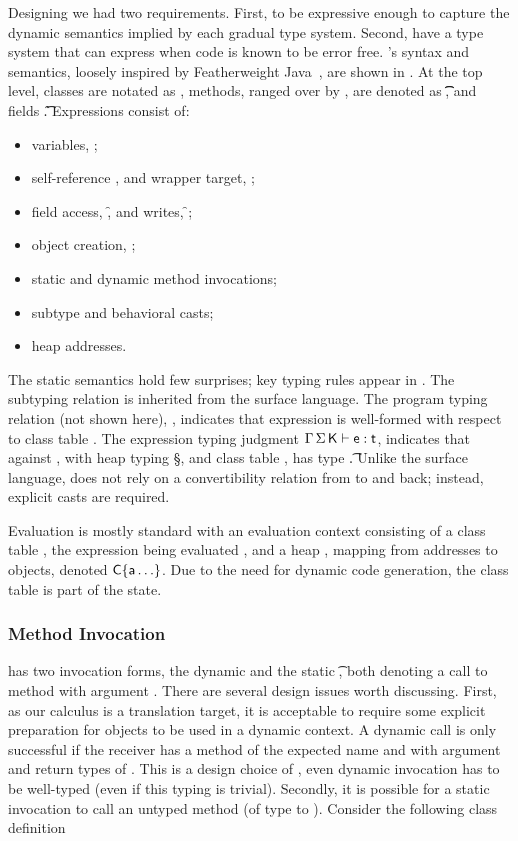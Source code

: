 \documentclass[USenglish]{tex/lipics-v2016}
\begin{document}
Designing \kafka we had two requirements. First, to be expressive enough to
capture the dynamic semantics implied by each gradual type system. Second,
have a type system that can express when code is known to be error
free. \kafka's syntax and semantics, loosely inspired by Featherweight
Java~\cite{FJ}, are shown in .  At the top level, classes
are notated as \Class{}, methods, ranged over by \md,
are denoted as \Mdef\m\x\t\t\e, and fields \Fdef\f\t. Expressions consist
of:

\vspace{-3mm}

\begin{itemize}
\item variables, \x;
\item self-reference \this, and wrapper target, \that;
\item field access, \FRead\f, and writes, \FWrite\f\e;
\item object creation, \New{};
\item static and dynamic method invocations;
\item subtype and behavioral casts;
\item heap addresses.
\end{itemize}

\noindent
The static semantics hold few surprises; key typing rules appear in
. The subtyping relation is inherited from the surface
language.  The program typing relation (not shown here), \WFp\e\K, indicates
that expression \e is well-formed with respect to class table \K. The
expression typing judgment $\EnvType \Env\S\K\e\t$, indicates that against
\Env, with heap typing \S, and class table \K, \e has type \t.  Unlike the
surface language, \kafka does not rely on a convertibility relation from
\any to \C and back; instead, explicit casts are required.

Evaluation is mostly standard with an evaluation context consisting of a
class table \K, the expression being evaluated \e, and a heap \s, mapping
from addresses \a to objects, denoted $\C\{\a\ldots\}$. Due to the need for
dynamic code generation, the class table is part of the state.

\subsubsection{Method Invocation}

\kafka has two invocation forms, the dynamic \DynCall\e\m\ep and the static
\KCall\e\m\ep\t\tp, both denoting a call to method \m with argument \ep.
There are several design issues worth discussing.  First, as our calculus is
a translation target, it is acceptable to require some explicit preparation
for objects to be used in a dynamic context.  A dynamic call is only
successful if the receiver has a method of the expected name and with
argument and return types of \any. This is a design choice of \kafka, even
dynamic invocation has to be well-typed (even if this typing is
trivial).  Secondly, it is possible for a static invocation to call an untyped
method (of type \any to \any).
Consider the following
class definition
\end{document}
